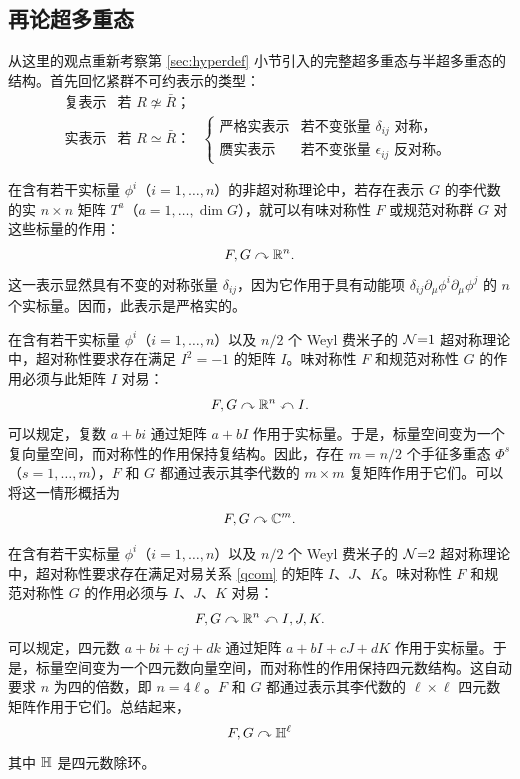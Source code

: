 \subsection{再论超多重态}\label{sec:hyperrevisited}
从这里的观点重新考察第 \ref{sec:hyperdef} 小节引入的完整超多重态与半超多重态的结构。首先回忆紧群不可约表示的类型：
\begin{equation}
\begin{array}{rll}
\text{复表示}&\text{若 $R\not\simeq\bar R$；}&\\
\text{实表示}&\text{若 $R\simeq\bar R$：}&\begin{cases}
\text{严格实表示}&\text{若不变张量 $\delta_{ij}$ 对称，}\\
\text{赝实表示}&\text{若不变张量 $\epsilon_{ij}$ 反对称。}
\end{cases}
\end{array}
\end{equation}

在含有若干实标量 $\phi^i$（$i=1,\ldots,n$）的非超对称理论中，若存在表示 $G$ 的李代数的实 $n\times n$ 矩阵 $T^a$（$a=1,\ldots,\dim G$），就可以有味对称性 $F$ 或规范对称群 $G$ 对这些标量的作用：
\begin{equation}
F,G\curvearrowright\mathbb{R}^n.
\end{equation}
这一表示显然具有不变的对称张量 $\delta_{ij}$，因为它作用于具有动能项 $\delta_{ij}\partial_\mu\phi^i\partial_\mu\phi^j$ 的 $n$ 个实标量。因而，此表示是严格实的。

在含有若干实标量 $\phi^i$（$i=1,\ldots,n$）以及 $n/2$ 个 Weyl 费米子的 $\mathcal{N}{=}1$ 超对称理论中，超对称性要求存在满足 $I^2=-1$ 的矩阵 $I$。味对称性 $F$ 和规范对称性 $G$ 的作用必须与此矩阵 $I$ 对易：
\begin{equation}
F,G\curvearrowright\mathbb{R}^n\curvearrowleft I.
\end{equation}
可以规定，复数 $a+bi$ 通过矩阵 $a+bI$ 作用于实标量。于是，标量空间变为一个复向量空间，而对称性的作用保持复结构。因此，存在 $m=n/2$ 个手征多重态 $\Phi^s$（$s=1,\ldots,m$），$F$ 和 $G$ 都通过表示其李代数的 $m\times m$ 复矩阵作用于它们。可以将这一情形概括为
\begin{equation}
F,G\curvearrowright\mathbb{C}^m.
\end{equation}

在含有若干实标量 $\phi^i$（$i=1,\ldots,n$）以及 $n/2$ 个 Weyl 费米子的 $\mathcal{N}{=}2$ 超对称理论中，超对称性要求存在满足对易关系 \eqref{qcom} 的矩阵 $I$、$J$、$K$。味对称性 $F$ 和规范对称性 $G$ 的作用必须与 $I$、$J$、$K$ 对易：
\begin{equation}
F,G\curvearrowright\mathbb{R}^n\curvearrowleft I,J,K.
\end{equation}
可以规定，四元数 $a+bi+cj+dk$ 通过矩阵 $a+bI+cJ+dK$ 作用于实标量。于是，标量空间变为一个四元数向量空间，而对称性的作用保持四元数结构。这自动要求 $n$ 为四的倍数，即 $n=4\ell$。$F$ 和 $G$ 都通过表示其李代数的 $\ell\times\ell$ 四元数矩阵作用于它们。总结起来，
\begin{equation}
F,G\curvearrowright\mathbb{H}^\ell
\end{equation}
其中 $\mathbb{H}$ 是四元数除环。

